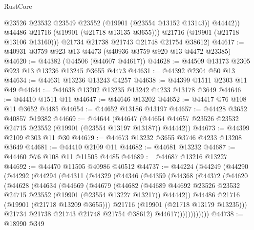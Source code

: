 \begin{lexlean}{RustCore}
\begin{coremodule}
              @23526
              @23532
              @23549
              @23552
              (@19901 (@23554 @13152 @13143))
              @44442))
          @44486
          @21716
          (@19901 (@21718 @13135 @3655)))
        @21716
        (@19901 (@21718 @13106 @13160)))
      @21734
      @21738
      @21743
      @21748
      @21754
      @38612)
@44617 := @40931 @3759 @923 @13 @4473 (@40936 @3759 @920 @13 @4472 @23385)
@44620 := @44382 (@44506 (@44607 @44617))
@44628 := @44509 @13173 @2305 @923 @13 @13236 @13245 @3655 @4473
@44631 := @44392 @2304 @50 @13
@44634 := @44631 @13236 @13243 @4257
@44638 := @44399 @1511 @2303 @11 @49
@44644 := @44638 @13202 @13235 @13242 @4233 @13178 @3649
@44646 := @44410 @1511 @11
@44647 := @44646 @13202
@44652 := @44417 @76 @108 @11 @3652 @4485
@44654 := @44652 @13186 @13197
@44657 := @44428 @3652 @40857 @19382
@44669 := @44644
    (@44647 (@44654 @44657 @23526 @23532 @24715 @23552 (@19901 (@23554 @13197 @13187)) @44442))
@44673 := @44399 @2109 @303 @11 @30
@44679 := @44673 @13232 @3655 @3746 @4233 @13208 @3649
@44681 := @44410 @2109 @11
@44682 := @44681 @13232
@44687 := @44460 @76 @108 @11 @11505 @4485
@44689 := @44687 @13216 @13227
@44692 := @44470 @11505 @40986 @40512
@44737 := @44224
    (@44249
      (@44290
        (@44292
          (@44294
            (@44311
              (@44329
                (@44346
                  (@44359
                    (@44368
                      (@44372
                        (@44620
                          (@44628
                            (@44634
                              (@44669
                                (@44679
                                  (@44682
                                    (@44689
                                      @44692
                                      @23526
                                      @23532
                                      @24715
                                      @23552
                                      (@19901 (@23554 @13227 @13217))
                                      @44442))
                                  @44486
                                  @21716
                                  (@19901 (@21718 @13209 @3655)))
                                @21716
                                (@19901 (@21718 @13179 @13235)))
                              @21734
                              @21738
                              @21743
                              @21748
                              @21754
                              @38612)
                            @44617))))))))))))
@44738 := @18990 @349

\end{coremodule}
\end{lexlean}
